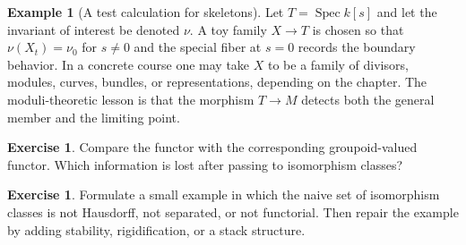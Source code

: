 \documentclass[11pt]{amsart}
\theoremstyle{definition}
\newtheorem{example}[theorem]{Example}
\newtheorem{exercise}[theorem]{Exercise}
\newcommand{\Spec}{\operatorname{Spec}}
\begin{document}
\begin{example}[A test calculation for skeletons]
Let $T=\Spec k[s]$ and let the invariant of interest be denoted $\nu$.  A toy family $X\to T$ is chosen so that $\nu(X_t)=\nu_0$ for $s\ne0$ and the special fiber at $s=0$ records the boundary behavior.  In a concrete course one may take $X$ to be a family of divisors, modules, curves, bundles, or representations, depending on the chapter.  The moduli-theoretic lesson is that the morphism $T\to M$ detects both the general member and the limiting point.
\end{example}
\begin{exercise}
Compare the functor with the corresponding groupoid-valued functor.  Which information is lost after passing to isomorphism classes?
\end{exercise}
\begin{exercise}
Formulate a small example in which the naive set of isomorphism classes is not Hausdorff, not separated, or not functorial.  Then repair the example by adding stability, rigidification, or a stack structure.
\end{exercise}
\clearpage
\end{document}
